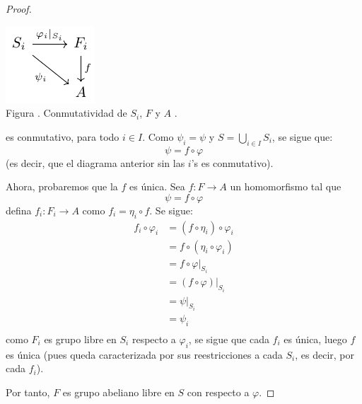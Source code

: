 \documentclass[12pt]{report}
\newcounter{it}
\theoremstyle{largebreak}
\newcommand\cf[3]{\ensuremath{#1:#2\rightarrow#3}}
\newcounter{figcount}
\begin{document}
\begin{proof}
        \begin{minipage}{\textwidth}
            \begin{center}
                \includegraphics[scale=1.5]{images/fig_9.pdf}\\
                Figura \thefigcount. Conmutatividad de $S_i$, $F$ y $A$ .
            \end{center}
        \end{minipage}

        es conmutativo, para todo $i\in I$. Como $\psi_i=\psi$ y $S=\bigcup_{i\in I}S_i$, se sigue que:
        \begin{equation*}
            \psi=f\circ\varphi
        \end{equation*}
        (es decir, que el diagrama anterior sin las $i$'s es conmutativo).

        Ahora, probaremos que la $f$ es única. Sea $\cf{f}{F}{A}$ un homomorfismo tal que
        \begin{equation*}
            \psi=f\circ\varphi
        \end{equation*}
        defina $\cf{f_i}{F_i}{A}$ como $f_i=\eta_i\circ f$. Se sigue:
        \begin{equation*}
            \begin{split}
                f_i\circ\varphi_i&=(f\circ\eta_i)\circ\varphi_i\\
                &=f\circ(\eta_i\circ\varphi_i)\\
                &=f\circ\varphi\big|_{S_i}\\
                &=(f\circ \varphi)\big|_{S_i}\\
                &=\psi\big|_{S_i}\\
                &=\psi_i\\
            \end{split}
        \end{equation*}
        como $F_i$ es grupo libre en $S_i$ respecto a $\varphi_i$, se sigue que cada $f_i$ es única, luego $f$ es única (pues queda caracterizada por sus reestricciones a cada $S_i$, es decir, por cada $f_i$).

        Por tanto, $F$ es grupo abeliano libre en $S$ con respecto a $\varphi$.
    \end{proof}
\end{document}
